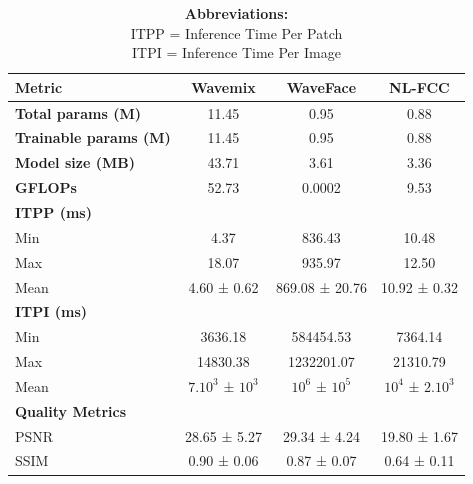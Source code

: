 \begin{table}[H]
\centering
\caption{Comparison of Wavemix, NL-FCC, and WaveFace Models}
\begin{tabular}{lccc}
\hline
\textbf{Metric} & \textbf{Wavemix} & \textbf{WaveFace} & \textbf{NL-FCC} \\
\hline
\textbf{Total params (M)}         & 11.45   & 0.95   & 0.88 \\
\textbf{Trainable params (M)}     & 11.45   & 0.95   & 0.88 \\
\textbf{Model size (MB)}          & 43.71   & 3.61   & 3.36 \\
\textbf{GFLOPs}                   & 52.73   & 0.0002   & 9.53 \\
\hline
\textbf{ITPP (ms)} &       &        &        \\
\quad Min                          & 4.37    & 836.43  & 10.48 \\
\quad Max                          & 18.07    & 935.97  & 12.50 \\
\quad Mean                         & 4.60 ± 0.62 & 869.08 ± 20.76 & 10.92 ± 0.32 \\
\hline
\textbf{ITPI (ms)} &       &        &        \\
\quad Min                          & 3636.18 & 584454.53 & 7364.14 \\
\quad Max                          & 14830.38 & 1232201.07 & 21310.79 \\
\quad Mean                         & $7.10^3$ ± $10^3$ & $10^6$ ± $10^5$ & $10^4$ ± $2.10^3$ \\
\hline
\textbf{Quality Metrics}           &         &         &        \\
\quad PSNR                         & 28.65 ± 5.27 & 29.34 ± 4.24 & 19.80 ± 1.67 \\
\quad SSIM                         & 0.90 ± 0.06 & 0.87 ± 0.07 & 0.64 ± 0.11 \\
\hline
\end{tabular}
\caption*{\textbf{Abbreviations:} \\
ITPP = Inference Time Per Patch \\
ITPI = Inference Time Per Image}
\label{tab:model_comparison}
\end{table}


